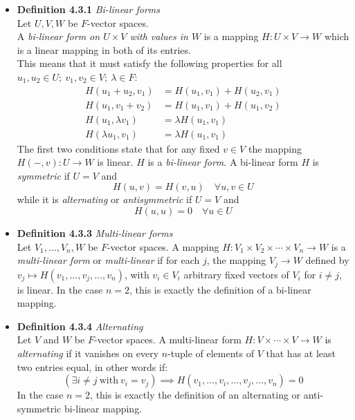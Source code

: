 \documentclass[11pt,a4paper]{article}
\begin{document}
\begin{itemize}
    \item \textbf{Definition 4.3.1} \emph{Bi-linear forms} \\
        Let $U,V, W$ be $F$-vector spaces. \\
        A \emph{bi-linear form on $U \times V$ with values in $W$} is a mapping
        $H:U \times V \to W$ which is a linear mapping in both of its entries. \\
        This means that it must satisfy the following properties for all
        $u_1, u_2 \in U; \ v_1, v_2 \in V; \ \lambda \in F$:
        \begin{align*}{}
            H(u_1 + u_2, v_1)   &= H(u_1, v_1) + H(u_2, v_1) \\
            H(u_1, v_1 + v_2)   &= H(u_1, v_1) + H(u_1, v_2) \\
            H(u_1, \lambda v_1) &= \lambda H(u_1, v_1) \\
            H(\lambda u_1, v_1) &= \lambda H(u_1, v_1)
        \end{align*}
        The first two conditions state that for any fixed $v \in V$ the mapping
        $H(-, v) : U \to W$ is linear.
        $H$ is a \emph{bi-linear form}.
        A bi-linear form $H$ is \emph{symmetric} if $U=V$ and
        \[
            H(u, v) = H(v, u) \quad \forall u, v \in U
        \]
        while it is \emph{alternating} or \emph{antisymmetric} if $U=V$ and
        \[
            H(u, u) = 0 \quad \forall u \in U
        \]

    \item \textbf{Definition 4.3.3} \emph{Multi-linear forms} \\
        Let $V_1, \ldots, V_n, W$ be $F$-vector spaces.
        A mapping $H : V_1 \times V_2 \times \cdots \times V_n \to W$ is a
        \emph{multi-linear form} or \emph{multi-linear} if for each $j$,
        the mapping $V_j \to W$ defined by $v_j \mapsto H(v_1, \ldots, v_j, \ldots, v_n)$,
        with $v_i \in V_i$ arbitrary fixed vectors of $V_i$ for $i \neq j$, is linear.
        In the case $n=2$, this is exactly the definition of a bi-linear mapping.

    \item \textbf{Definition 4.3.4} \emph{Alternating} \\
        Let $V$ and $W$ be $F$-vector spaces.
        A multi-linear form $H : V \times \cdots \times V \to W$
        is \emph{alternating} if it vanishes on every $n$-tuple of elements of $V$ that has at
        least two entries equal, in other words if:
        \[
            (\exists i \neq j \ \mathrm{with} \ v_i = v_j) \implies
            H(v_1, \ldots, v_i, \ldots, v_j, \ldots, v_n) = 0
        \]
        In the case $n=2$, this is exactly the definition of an alternating or
        anti-symmetric bi-linear mapping.


\end{itemize}
\end{document}
